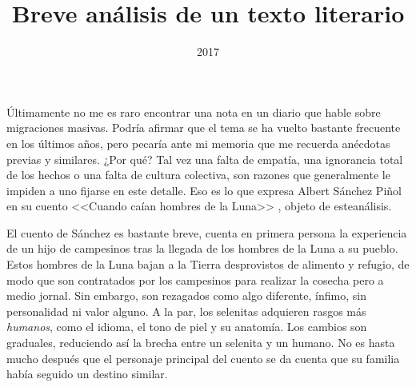 \documentclass[a4paper]{tufte-handout}
\title{Breve análisis de un texto literario}
\date{2017}
\begin{document}
\maketitle

Últimamente no me es raro encontrar una nota en un diario que
hable sobre migraciones masivas. Podría afirmar que el tema se ha
vuelto bastante frecuente en los últimos años, pero pecaría ante mi
memoria que me recuerda anécdotas previas y similares. ¿Por qué?
Tal vez una falta de empatía, una ignorancia total de los hechos
o una falta de cultura colectiva, son razones que generalmente le
impiden a uno fijarse en este detalle. Eso es lo que expresa Albert
Sánchez Piñol en su cuento <<Cuando caían hombres de la Luna>> \citep{Albert}, objeto de esteanálisis.

El cuento de Sánchez es bastante breve, cuenta en primera persona la experiencia de un hijo de campesinos tras la llegada de los hombres de la Luna a su pueblo. Estos hombres de la Luna bajan a la Tierra desprovistos de alimento y refugio, de modo que son contratados por los campesinos para realizar la cosecha pero a medio jornal. Sin embargo, son rezagados como algo diferente, ínfimo, sin personalidad ni valor alguno. A la par, los selenitas adquieren rasgos más \emph{humanos}, como el idioma, el tono de piel y su anatomía. Los cambios son graduales, reduciendo así la brecha entre un selenita y un humano. No es hasta mucho después que el personaje principal del cuento se da cuenta que su familia había seguido un destino similar.
\end{document}
